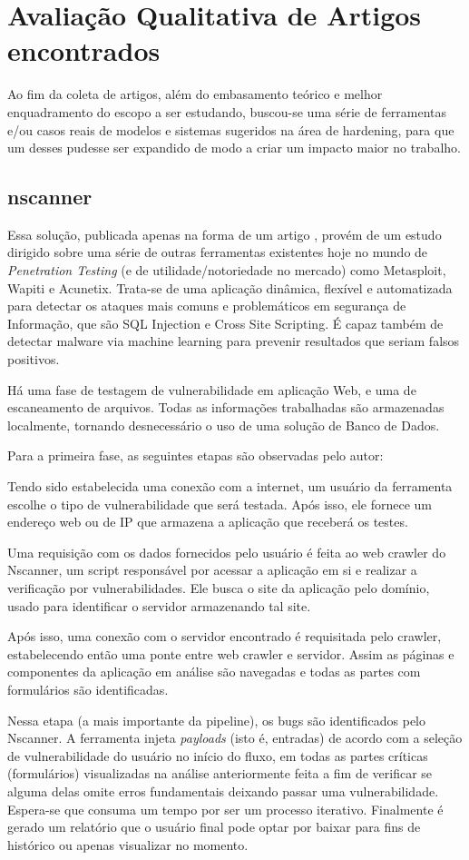 \section{Avaliação Qualitativa de Artigos encontrados}
Ao fim da coleta de artigos, além do embasamento teórico e melhor enquadramento do escopo a ser estudando, buscou-se uma série de ferramentas e/ou casos reais de modelos e sistemas sugeridos na área de hardening, para que um desses pudesse ser expandido de modo a criar um impacto maior no trabalho.

\subsection{nscanner}
Essa solução, publicada apenas na forma de um artigo \cite{surian_nscanner_2020}, provém de um estudo dirigido sobre uma série de outras ferramentas existentes hoje no mundo de \textit{Penetration Testing} (e de utilidade/notoriedade no mercado) como Metasploit, Wapiti e Acunetix. Trata-se de uma aplicação dinâmica, flexível e automatizada para detectar os ataques mais comuns e problemáticos em segurança de Informação, que são SQL Injection e Cross Site Scripting. É capaz também de detectar malware via machine learning para prevenir resultados que seriam falsos positivos.

Há uma fase de testagem de vulnerabilidade em aplicação Web, e uma de escaneamento de arquivos. Todas as informações trabalhadas são armazenadas localmente, tornando desnecessário o uso de uma solução de Banco de Dados. 

Para a primeira fase, as seguintes etapas são observadas pelo autor:
\begin{alineas}
\item Tendo sido estabelecida uma conexão com a internet, um usuário da ferramenta escolhe o tipo de vulnerabilidade que será testada. Após isso, ele fornece um endereço web ou de IP que armazena a aplicação que receberá os testes.
\item Uma requisição com os dados fornecidos pelo usuário é feita ao web crawler do Nscanner, um script responsável por acessar a aplicação em si e realizar a verificação por vulnerabilidades. Ele busca o site da aplicação pelo domínio, usado para identificar o servidor armazenando tal site.
\item Após isso, uma conexão com o servidor encontrado é requisitada pelo crawler, estabelecendo então uma ponte entre web crawler e servidor. Assim as páginas e componentes da aplicação em análise são navegadas e todas as partes com formulários são identificadas.
\item Nessa etapa (a mais importante da pipeline), os bugs são identificados pelo Nscanner. A ferramenta injeta \textit{payloads} (isto é, entradas) de acordo com a seleção de vulnerabilidade do usuário no início do fluxo, em todas as partes críticas (formulários) visualizadas na análise anteriormente feita a fim de verificar se alguma delas omite erros fundamentais deixando passar uma vulnerabilidade. Espera-se que consuma um tempo por ser um processo iterativo. Finalmente é gerado um relatório que o usuário final pode optar por baixar para fins de histórico ou apenas visualizar no momento.
\end{alineas}

